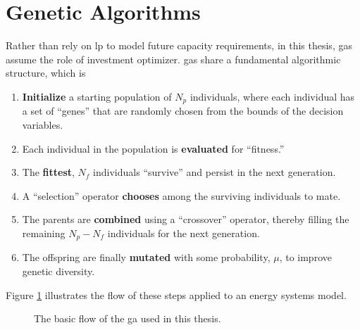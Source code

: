 \section{Genetic Algorithms}
\label{section:genetic-algorithms}

Rather than rely on \ac{lp} to model future capacity requirements, in this
thesis, \acp{ga} assume the role of investment optimizer. \acp{ga} share a
fundamental algorithmic structure, which is \cite{blank_pymoo_2020}
\begin{enumerate}
    \item \textbf{Initialize} a starting population of $N_p$ individuals, where
    each individual has a set of ``genes'' that are randomly chosen from the
    bounds of the decision variables.
    \item Each individual in the population is \textbf{evaluated} for
    ``fitness.'' 
    \item The \textbf{fittest}, $N_f$ individuals ``survive'' and persist in the
    next generation.
    \item A ``selection'' operator \textbf{chooses} among the surviving
    individuals to mate.
    \item The parents are \textbf{combined} using a ``crossover'' operator,
    thereby filling the remaining $N_p - N_f$ individuals for the next
    generation.
    \item The offspring are finally \textbf{mutated} with some probability,
    $\mu$, to improve genetic diversity.
\end{enumerate}
\noindent
Figure \ref{fig:genetic-alg} illustrates the flow of these steps applied to an
energy systems model.

\begin{figure}[ht]
        \centering
        \caption{The basic flow of the \ac{ga} used in this thesis.}
        \label{fig:genetic-alg}
\end{figure}

